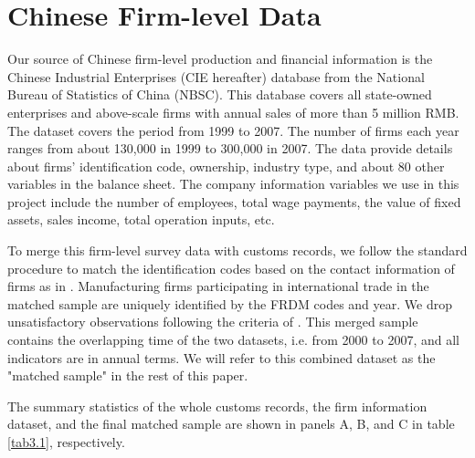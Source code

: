 \section{Chinese Firm-level Data}

Our source of Chinese firm-level production and financial information is the Chinese Industrial Enterprises (CIE hereafter) database from the National Bureau of Statistics of China (NBSC). This database covers all state-owned enterprises and above-scale firms with annual sales of more than 5 million RMB. The dataset covers the period from 1999 to 2007. The number of firms each year ranges from about 130,000 in 1999 to 300,000 in 2007. The data provide details about firms’ identification code, ownership, industry type, and about 80 other variables in the balance sheet. The company information variables we use in this project include the number of employees, total wage payments, the value of fixed assets, sales income, total operation inputs, etc.

To merge this firm-level survey data with customs records, we follow the standard procedure to match the identification codes based on the contact information of firms as in \cite{fan-li-yeaple2015}. Manufacturing firms participating in international trade in the matched sample are uniquely identified by the FRDM codes and year. We drop unsatisfactory observations following the criteria of \cite{bkl2021}. This merged sample contains the overlapping time of the two datasets, i.e. from 2000 to 2007, and all indicators are in annual terms. We will refer to this combined dataset as the "matched sample" in the rest of this paper.

The summary statistics of the whole customs records, the firm information dataset, and the final matched sample are shown in panels A, B, and C in table \ref{tab3.1}, respectively.

